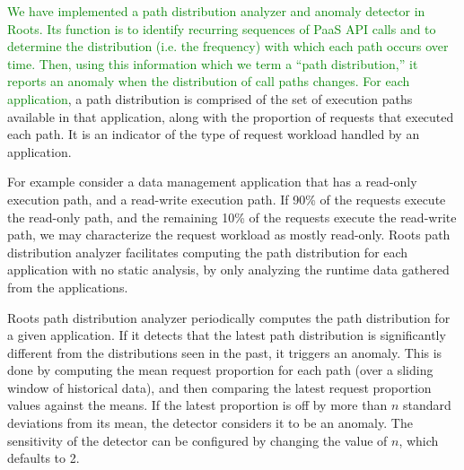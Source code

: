 \textcolor{green}{We have implemented a path distribution analyzer and anomaly
detector in Roots.
Its function is to identify recurring sequences of
PaaS API calls and to determine the distribution (i.e. the frequency) with
which each path occurs over time.  Then, using this information which we term
a ``path distribution,'' it reports an anomaly when the distribution of call paths
changes.}
%
\textcolor{green}{For each application},
a path distribution is comprised of the set of execution paths available in
that application, along
with the proportion of requests that executed each path.
It is an indicator of the type of request workload handled by an application.

For example consider a data management application that has a read-only execution path, and a read-write 
execution path. If 90\% of the requests execute the read-only path, and the remaining 10\% of the requests
execute the read-write path, we may characterize the request workload as mostly read-only. 
Roots path distribution analyzer facilitates computing the path distribution for each application
with no static analysis, by only analyzing the runtime data gathered from the applications.

Roots path distribution analyzer periodically computes the path distribution for a given application.
If it detects that the latest path distribution is significantly different from the distributions seen in the 
past, it triggers an anomaly. This is done by computing the mean request proportion for each path
(over a sliding window of historical data),
and then comparing the latest request proportion values against the means. If the latest proportion
is off by more than $n$ standard deviations from its mean, the detector considers it to be an
anomaly. The sensitivity of the detector can be configured by changing the value of $n$, which
defaults to 2. 

